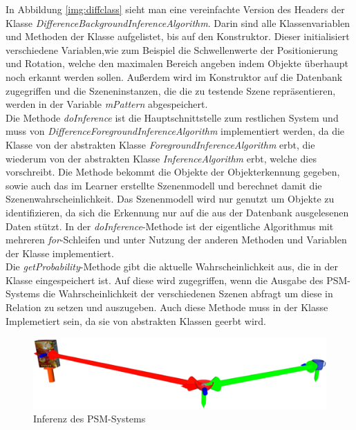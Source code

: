 In Abbildung \ref{img:diffclass} sieht man eine vereinfachte Version des Headers der Klasse \textit{DifferenceBackgroundInferenceAlgorithm}. Darin sind alle Klassenvariablen und Methoden der Klasse aufgelistet, bis auf den Konstruktor. Dieser initialisiert verschiedene Variablen,wie zum Beispiel die Schwellenwerte der Positionierung und Rotation, welche den maximalen Bereich angeben indem Objekte überhaupt noch erkannt werden sollen. Außerdem wird im Konstruktor auf die Datenbank zugegriffen und die Szeneninstanzen, die die zu testende Szene repräsentieren, werden in der Variable \textit{mPattern} abgespeichert.\smallskip\\
Die Methode \textit{doInference} ist die Hauptschnittstelle zum restlichen System und muss von \textit{DifferenceForegroundInferenceAlgorithm} implementiert werden, da die Klasse von der abstrakten Klasse \textit{ForegroundInferenceAlgorithm} erbt, die wiederum von der abstrakten Klasse \textit{InferenceAlgorithm} erbt, welche dies vorschreibt. Die Methode bekommt die Objekte der Objekterkennung gegeben, sowie auch das im Learner erstellte Szenenmodell und berechnet damit die Szenenwahrscheinlichkeit. Das Szenenmodell wird nur genutzt um Objekte zu identifizieren, da sich die Erkennung nur auf die aus der Datenbank ausgelesenen Daten stützt. In der \textit{doInference}-Methode ist der eigentliche Algorithmus mit mehreren \textit{for}-Schleifen und unter Nutzung der anderen Methoden und Variablen der Klasse  implementiert.\smallskip\\
Die \textit{getProbability}-Methode gibt die aktuelle Wahrscheinlichkeit aus, die in der Klasse eingespeichert ist. Auf diese wird zugegriffen, wenn die Ausgabe des PSM-Systems die Wahrscheinlichkeit der verschiedenen Szenen abfragt um diese in Relation zu setzen und auszugeben. Auch diese Methode muss in der Klasse Implemetiert sein, da sie von abstrakten Klassen geerbt wird.\smallskip\\
\begin{figure}
	\centering
	\includegraphics[width=14cm]{bilder/inferenceexample.pdf}
	\caption{Inferenz des PSM-Systems \cite{gassner17}}
	\label{img:inferenceexample}
\end{figure}
